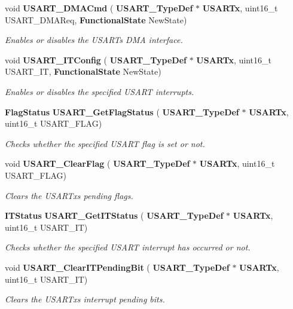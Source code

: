 \begin{DoxyCompactItemize}
void \textbf{ U\+S\+A\+R\+T\+\_\+\+D\+M\+A\+Cmd} (\textbf{ U\+S\+A\+R\+T\+\_\+\+Type\+Def} $\ast$\textbf{ U\+S\+A\+R\+Tx}, uint16\+\_\+t U\+S\+A\+R\+T\+\_\+\+D\+M\+A\+Req, \textbf{ Functional\+State} New\+State)
\begin{DoxyCompactList}\small\item\em Enables or disables the U\+S\+A\+RT\textquotesingle{}s D\+MA interface. \end{DoxyCompactList}\item 
void \textbf{ U\+S\+A\+R\+T\+\_\+\+I\+T\+Config} (\textbf{ U\+S\+A\+R\+T\+\_\+\+Type\+Def} $\ast$\textbf{ U\+S\+A\+R\+Tx}, uint16\+\_\+t U\+S\+A\+R\+T\+\_\+\+IT, \textbf{ Functional\+State} New\+State)
\begin{DoxyCompactList}\small\item\em Enables or disables the specified U\+S\+A\+RT interrupts. \end{DoxyCompactList}\item 
\textbf{ Flag\+Status} \textbf{ U\+S\+A\+R\+T\+\_\+\+Get\+Flag\+Status} (\textbf{ U\+S\+A\+R\+T\+\_\+\+Type\+Def} $\ast$\textbf{ U\+S\+A\+R\+Tx}, uint16\+\_\+t U\+S\+A\+R\+T\+\_\+\+F\+L\+AG)
\begin{DoxyCompactList}\small\item\em Checks whether the specified U\+S\+A\+RT flag is set or not. \end{DoxyCompactList}\item 
void \textbf{ U\+S\+A\+R\+T\+\_\+\+Clear\+Flag} (\textbf{ U\+S\+A\+R\+T\+\_\+\+Type\+Def} $\ast$\textbf{ U\+S\+A\+R\+Tx}, uint16\+\_\+t U\+S\+A\+R\+T\+\_\+\+F\+L\+AG)
\begin{DoxyCompactList}\small\item\em Clears the U\+S\+A\+R\+Tx\textquotesingle{}s pending flags. \end{DoxyCompactList}\item 
\textbf{ I\+T\+Status} \textbf{ U\+S\+A\+R\+T\+\_\+\+Get\+I\+T\+Status} (\textbf{ U\+S\+A\+R\+T\+\_\+\+Type\+Def} $\ast$\textbf{ U\+S\+A\+R\+Tx}, uint16\+\_\+t U\+S\+A\+R\+T\+\_\+\+IT)
\begin{DoxyCompactList}\small\item\em Checks whether the specified U\+S\+A\+RT interrupt has occurred or not. \end{DoxyCompactList}\item 
void \textbf{ U\+S\+A\+R\+T\+\_\+\+Clear\+I\+T\+Pending\+Bit} (\textbf{ U\+S\+A\+R\+T\+\_\+\+Type\+Def} $\ast$\textbf{ U\+S\+A\+R\+Tx}, uint16\+\_\+t U\+S\+A\+R\+T\+\_\+\+IT)
\begin{DoxyCompactList}\small\item\em Clears the U\+S\+A\+R\+Tx\textquotesingle{}s interrupt pending bits. \end{DoxyCompactList}\end{DoxyCompactItemize}


